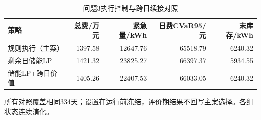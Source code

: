 \begin{table}[htbp]\centering\small
\caption{问题3执行控制与跨日续接对照}
\label{tab:v2_controllers}
\begin{tabularx}{\linewidth}{LRRRR}\toprule
策略 & 总费/万元 & 紧急量/kWh & 日费CVaR95/元 & 末库存/kWh\\\midrule
规则执行（主案） & 1397.58 & 12647.76 & 65518.79 & 6240.32\\
剩余日储能LP & 1421.32 & 23825.27 & 66397.37 & 5934.55\\
储能LP+跨日价值 & 1405.26 & 22407.53 & 66033.05 & 6240.32\\
\bottomrule\end{tabularx}
\par\smallskip\parbox{\linewidth}{\footnotesize 所有对照覆盖相同334天；设置在运行前冻结，评价期结果不回写主案选择。各组状态连续演化。}
\end{table}